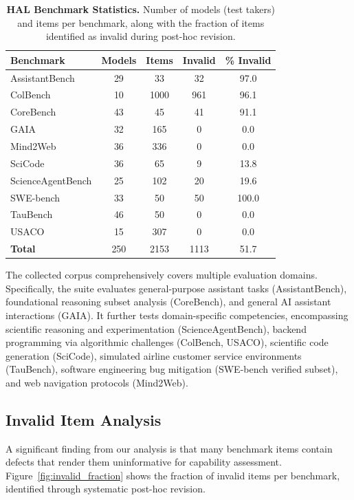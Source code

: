 \documentclass{article}
\theoremstyle{plain}
\theoremstyle{definition}
\theoremstyle{remark}
\begin{document}
\begin{table}[h]
\centering
\caption{\textbf{HAL Benchmark Statistics.} Number of models (test takers) and items per benchmark, along with the fraction of items identified as invalid during post-hoc revision.}
\label{tab:hal_benchmarks}
\small
\begin{tabular}{lcccc}
\toprule
\textbf{Benchmark} & \textbf{Models} & \textbf{Items} & \textbf{Invalid} & \textbf{\% Invalid} \\
\midrule
AssistantBench & 29 & 33 & 32 & 97.0 \\
ColBench & 10 & 1000 & 961 & 96.1 \\
CoreBench & 43 & 45 & 41 & 91.1 \\
GAIA & 32 & 165 & 0 & 0.0 \\
Mind2Web & 36 & 336 & 0 & 0.0 \\
SciCode & 36 & 65 & 9 & 13.8 \\
ScienceAgentBench & 25 & 102 & 20 & 19.6 \\
SWE-bench & 33 & 50 & 50 & 100.0 \\
TauBench & 46 & 50 & 0 & 0.0 \\
USACO & 15 & 307 & 0 & 0.0 \\
\midrule
\textbf{Total} & 250 & 2153 & 1113 & 51.7 \\
\bottomrule
\end{tabular}
\end{table}

The collected corpus comprehensively covers multiple evaluation domains. Specifically, the suite evaluates general-purpose assistant tasks (AssistantBench), foundational reasoning subset analysis (CoreBench), and general AI assistant interactions (GAIA). It further tests domain-specific competencies, encompassing scientific reasoning and experimentation (ScienceAgentBench), backend programming via algorithmic challenges (ColBench, USACO), scientific code generation (SciCode), simulated airline customer service environments (TauBench), software engineering bug mitigation (SWE-bench verified subset), and web navigation protocols (Mind2Web).

\subsection{Invalid Item Analysis}

A significant finding from our analysis is that many benchmark items contain defects that render them uninformative for capability assessment. Figure~\ref{fig:invalid_fraction} shows the fraction of invalid items per benchmark, identified through systematic post-hoc revision.
\end{document}
